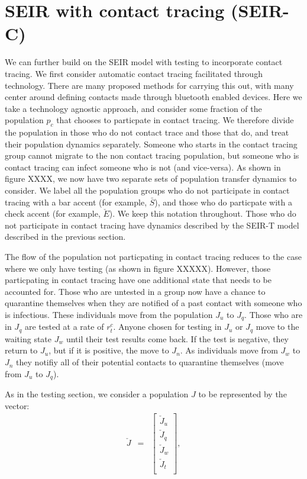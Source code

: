 \documentclass[notitlepage, superscriptaddress]{revtex4-2}
\begin{document}
\section{SEIR with contact tracing (SEIR-C)}
We can further build on the SEIR model with testing to incorporate contact tracing. We first consider automatic contact tracing facilitated through technology. There are many proposed methods for carrying this out, with many center around defining contacts made through bluetooth enabled devices. Here we take a technology agnostic approach, and consider some fraction of the population $p_{c}$ that chooses to particpate in contact tracing. We therefore divide the population in those who do not contact trace and those that do, and treat their population dynamics separately. Someone who starts in the contact tracing group cannot migrate to the non contact tracing population, but someone who is contact tracing can infect someone who is not (and vice-versa). As shown in figure XXXX, we now have two separate sets of population transfer dynamics to consider. We label all the population groups who do not participate in contact tracing with a bar accent (for example, $\bar{S}$), and those who do particpate with a check accent (for example, $\check{E}$). We keep this notation throughout. Those who do not participate in contact tracing have dynamics described by the SEIR-T model described in the previous section.

The flow of the population not particpating in contact tracing reduces to the case where we only have testing (as shown in figure XXXXX). However, those particpating in contact tracing have one additional state that needs to be accounted for. Those who are untested in a group now have a chance to quarantine themselves when they are notified of a past contact with someone who is infectious. These individuals move from the population $J_{u}$ to $J_{q}$. Those who are in $J_{q}$ are tested at a rate of $r^{c}_{t}$. Anyone chosen for testing in $J_{u}$ or $J_{q}$ move to the waiting state $J_{w}$ until their test results come back. If the test is negative, they return to $J_{u}$, but if it is positive, the move to $J_{n}$. As individuals move from $J_{w}$ to $J_{n}$ they notifiy all of their potential contacts to quarantine themselves (move from $J_{u}$ to $J_{q}$). 

As in the testing section, we consider a population $J$ to be represented by the vector:
\begin{eqnarray}
\check{J} &=& 
    \begin{bmatrix}
    \check{J}_{u} \\
    \check{J}_{q} \\
    \check{J}_{w} \\
    \check{J}_{t} \\
    \end{bmatrix},
\end{eqnarray}
\end{document}
